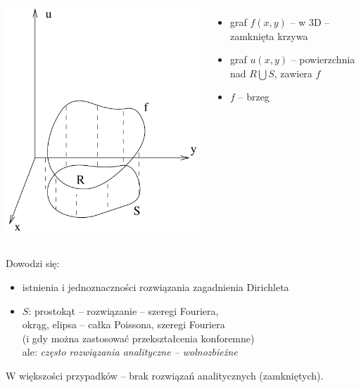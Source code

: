 \begin{frame}
  \begin{columns}
      \includegraphics[width = \linewidth]{img/23/dirichlet}
      \begin{itemize}
        \item graf $f(x,y)$ -- w 3D -- zamknięta krzywa
        \item graf $u(x,y)$ -- powierzchnia nad $R \bigcup S$, zawiera $f$
        \item $f$ -- brzeg
      \end{itemize}
  \end{columns}
\end{frame}

\begin{frame}
  Dowodzi się:
  \begin{itemize}
    \item istnienia i jednoznaczności rozwiązania zagadnienia Dirichleta
    \item $S$: prostokąt -- rozwiązanie -- szeregi Fouriera, \\
    okrąg, elipsa -- całka Poissona, szeregi Fouriera \\
    (i gdy można zastosować przekształcenia konforemne) \\
    ale: \textit{często rozwiązania analityczne -- wolnozbieżne}
  \end{itemize}

  W większości przypadków -- brak rozwiązań analitycznych (zamkniętych).
\end{frame}

